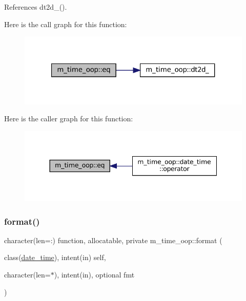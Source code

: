 References dt2d\+\_\+().

Here is the call graph for this function\+:\nopagebreak
\begin{figure}[H]
\begin{center}
\leavevmode
\includegraphics[width=321pt]{namespacem__time__oop_afcc34853af3eda020eb5ff802e04964d_cgraph}
\end{center}
\end{figure}
Here is the caller graph for this function\+:\nopagebreak
\begin{figure}[H]
\begin{center}
\leavevmode
\includegraphics[width=344pt]{namespacem__time__oop_afcc34853af3eda020eb5ff802e04964d_icgraph}
\end{center}
\end{figure}
\mbox{\label{namespacem__time__oop_a78bb598e3481faa48df9733a3f9ae060}} 
\subsubsection{\texorpdfstring{format()}{format()}}
{\footnotesize\ttfamily character(len=\+:) function, allocatable, private m\+\_\+time\+\_\+oop\+::format (\begin{DoxyParamCaption}\item[{class(\mbox{\hyperlink{structm__time__oop_1_1date__time}{date\+\_\+time}}), intent(in)}]{self,  }\item[{character(len=$\ast$), intent(in), optional}]{fmt }\end{DoxyParamCaption})\hspace{0.3cm}{\ttfamily [private]}}



